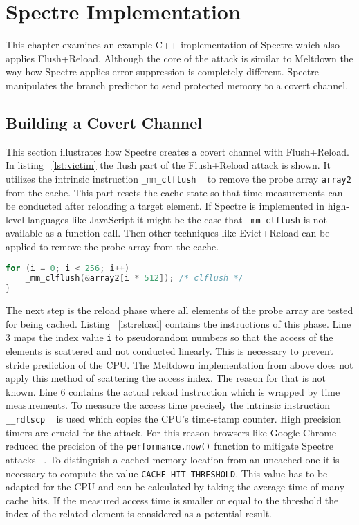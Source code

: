 \documentclass[a4paper,oneside,openright] {scrreprt}
\begin{document}
\section{Spectre Implementation}
\label{ch:intro:motivation}

This chapter examines an example C++ implementation of Spectre which also applies Flush+Reload. 
Although the core of the attack is similar to Meltdown the way how Spectre applies
error suppression is completely different. 
Spectre manipulates the branch predictor to send protected memory to a covert channel.

\subsection{Building a Covert Channel}
\label{ch:intro:motivation:A}
 
This section illustrates how Spectre creates a covert channel with Flush+Reload. 
In listing ~\ref{lst:victim} the flush part of the Flush+Reload attack is shown. It utilizes the intrinsic instruction 
\texttt{\_mm\_clflush} ~\cite{intelintrinsics} to remove the probe array \texttt{array2} from the cache. 
This part resets the cache state so that time measurements can be conducted after reloading a target element.
If Spectre is implemented in high-level languages like JavaScript it
might be the case that \texttt{\_mm\_clflush} is not available as a function call. 
Then other techniques like Evict+Reload can be applied to remove the probe array from the cache.

\begin{lstlisting}[language=C, caption=Spectre: Flush, label={lst:flush}]
for (i = 0; i < 256; i++)
    _mm_clflush(&array2[i * 512]); /* clflush */
}
\end{lstlisting}

The next step is the reload phase where all elements of the probe array are tested for being cached. 
Listing ~\ref{lst:reload} contains the instructions of this phase. 
Line 3 maps the index value \texttt{i} to pseudorandom numbers
 so that the access of the elements is scattered and not conducted linearly. 
This is necessary to prevent stride prediction of the CPU. 
The Meltdown implementation from above does not apply this method of scattering the access index.
The reason for that is not known.
Line 6 contains the actual reload instruction which is wrapped by time measurements.
To measure the access time precisely the intrinsic instruction \texttt{\_\_rdtscp} ~\cite{intelintrinsics} is used which
copies the CPU's time-stamp counter. High precision timers are crucial for the attack. For this reason browsers like 
Google Chrome reduced the precision of the \texttt{performance.now()} function to mitigate Spectre attacks ~\cite{chromeSpectreMeltdown}.
To distinguish a cached memory location from an uncached one it is necessary to compute the value \texttt{CACHE\_HIT\_THRESHOLD}.
This value has to be adapted for the CPU and can be calculated by taking the average time of many cache hits.
If the measured access time is smaller or equal to the threshold the index of the related element is considered as a potential result.
\end{document}
